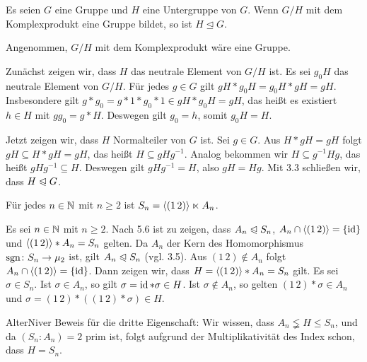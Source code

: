 \begin{exercisePage}
%
\setcounter{taskcount}{23}
%
\begin{exercise}
	Es seien $G$ eine Gruppe und $H$ eine Untergruppe von $G$. Wenn $G/H$ mit dem Komplexprodukt eine Gruppe bildet, so ist $H\unlhd G$.
\end{exercise}
\begin{solution}
	Angenommen, $G/H$ mit dem Komplexprodukt wäre eine Gruppe. 
	
	Zunächst zeigen wir, dass $H$ das neutrale Element von $G/H$ ist. Es sei $g_0H$ das neutrale Element von $G/H$. Für jedes $g\in G$ gilt $gH * g_0H=g_0H * gH=gH$. Insbesondere gilt $g * g_0=g * 1 * g_0 * 1\in gH * g_0H=gH$, das heißt es existiert $h\in H$ mit $gg_0=g * H$. Deswegen gilt $g_0=h$, somit $g_0H=H$.
	
	Jetzt zeigen wir, dass $H$ Normalteiler von $G$ ist. Sei $g\in G$. Aus $H * gH=gH$ folgt $gH\subseteq H * gH=gH$, das heißt $H\subseteq gHg^{-1}$. Analog bekommen wir $H\subseteq g^{-1}Hg$, das heißt $gHg^{-1}\subseteq H$. Deswegen gilt $gHg^{-1}=H$, also $gH=Hg$. Mit 3.3 schließen wir, dass $H \mathrel{\trianglelefteqslant} G$.
\end{solution}

\begin{exercise}
	Für jedes $n \in \mathbb{N}$ mit $n \ge 2$ ist $S_n= \langle (1 \, 2) \rangle \ltimes A_n$.
\end{exercise}
\begin{solution}
	Es sei $n\in \mathbb{N}$ mit $n \ge 2$. Nach 5.6 ist zu zeigen, dass $A_n \mathrel{\trianglelefteqslant} S_n$, $A_n \cap \langle (1\, 2) \rangle = \left\{ \operatorname{id} \right\}$ und $\langle (1\, 2) \rangle * A_n = S_n$ gelten. Da $A_n$ der Kern des Homomorphismus $\operatorname{sgn} \colon S_n \to \mu_2$ ist, gilt $A_n \mathrel{\trianglelefteqslant} S_n$ (vgl. 3.5). Aus $(1\, 2)\notin A_n$ folgt $A_n \cap \langle (1\, 2) \rangle =\left\{ \operatorname{id} \right\}$. Dann zeigen wir, dass $H=\langle (1\, 2) \rangle * A_n = S_n$ gilt. Es sei $\sigma\in S_n$. Ist $\sigma\in A_n$, so gilt $\sigma = \operatorname{id} *\sigma \in H$. Ist $\sigma \notin A_n$, so gelten $(1\, 2) * \sigma \in A_n$ und $\sigma=(1\, 2) * ((1\, 2) * \sigma) \in H$.
	
	AlterNiver Beweis für die dritte Eigenschaft: Wir wissen, dass $A_n \lneqq H \leq S_n$, und da $(S_n \colon A_n)=2$ prim ist, folgt aufgrund der Multiplikativität des Index schon, dass $H = S_n$.
\end{solution}


\end{exercisePage}
